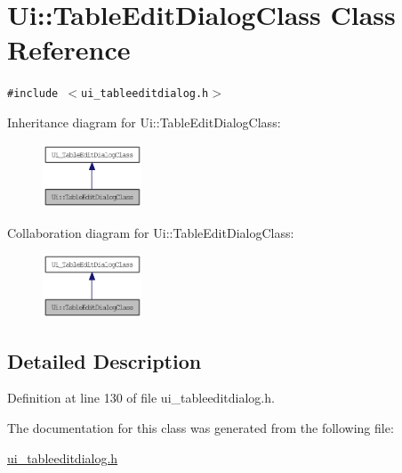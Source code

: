 \hypertarget{class_ui_1_1_table_edit_dialog_class}{
\section{Ui::TableEditDialogClass Class Reference}
\label{class_ui_1_1_table_edit_dialog_class}
}
{\tt \#include $<$ui\_\-tableeditdialog.h$>$}

Inheritance diagram for Ui::TableEditDialogClass:\nopagebreak
\begin{figure}[H]
\begin{center}
\leavevmode
\includegraphics[width=83pt]{class_ui_1_1_table_edit_dialog_class__inherit__graph}
\end{center}
\end{figure}
Collaboration diagram for Ui::TableEditDialogClass:\nopagebreak
\begin{figure}[H]
\begin{center}
\leavevmode
\includegraphics[width=83pt]{class_ui_1_1_table_edit_dialog_class__coll__graph}
\end{center}
\end{figure}


\subsection{Detailed Description}


Definition at line 130 of file ui\_\-tableeditdialog.h.

The documentation for this class was generated from the following file:\begin{CompactItemize}
\item 
\hyperlink{ui__tableeditdialog_8h}{ui\_\-tableeditdialog.h}\end{CompactItemize}
